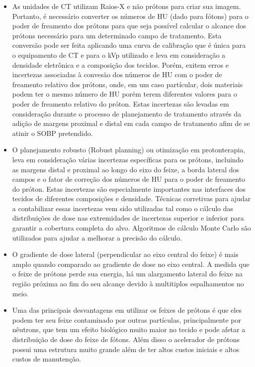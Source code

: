 \documentclass[11pt,a4paper]{article}
\newcounter{exemplo}
\begin{document}
\begin{exemplo}
\begin{itemize}
        \item As unidades de CT utilizam Raios-X e não prótons para criar sua imagem. Portanto, é necessário converter os números de HU (dado para fótons) para o poder de freamento dos prótons para que seja possível calcular o alcance dos prótons necessário para um determinado campo de tratamento. Esta conversão pode ser feita aplicando uma curva de calibração que é única para o equipamento de CT e para o kVp utilizado e leva em consideração a densidade eletrônica e a composição dos tecidos. Porém, exitem erros e incertezas associadas à convesão dos números de HU com o poder de freamento relativo dos prótons, onde, em um caso partícular, dois materiais podem ter o mesmo número de HU porém terem diferentes valores para o poder de freamento relativo do próton. Estas incertezas são levadas em consideração durante o processo de planejamento de tratamento através da adição de margens proximal e distal em cada campo de tratamento afim de se atinir o SOBP pretendido.
        
        \item O planejamento robusto (Robust planning) ou otimização em protonterapia, leva em consideração várias incertezas específicas para os prótons, incluindo as margens distal e proximal ao longo do eixo do feixe, a borda lateral dos campos e o fator de correção dos números de HU para o poder de freamento do próton. Estas incertezas são especialmente importantes nas interfaces dos tecidos de diferentes composições e densidade. Técnicas corretivas para ajudar a contabilizar essas incertezas vem sido utilizadas tal como o cálculo das distribuições de dose nas extremidades de incertezas superior e inferior para garantir a cobertura completa do alvo. Algoritmos de cálculo Monte Carlo são utilizados para ajudar a melhorar a precisão do cálculo.
        
        \item O gradiente de dose lateral (perpendicular ao  eixo central do feixe) é mais amplo quando comparado ao gradiente de dose no eixo central. A medida que o feixe de prótons perde sua energia, há um alargamento lateral do feixe na região próxima ao fim do seu alcançe devido à multitiplos espalhamentos no meio. 
        
        \item Uma das principais desvantagens em utilizar os feixes de prótons é que eles podem ter seu feixe contaminado por outras partículas, principalmente por nêutrons, que tem um efeito biológico muito maior no tecido e pode afetar a distribuição de dose do feixe de fótons. Além disso o acelerador de prótons possui uma estrutura muito grande além de ter altos custos iniciais e altos custos de manutenção.
        

\end{itemize}
\end{exemplo}
\end{document}
